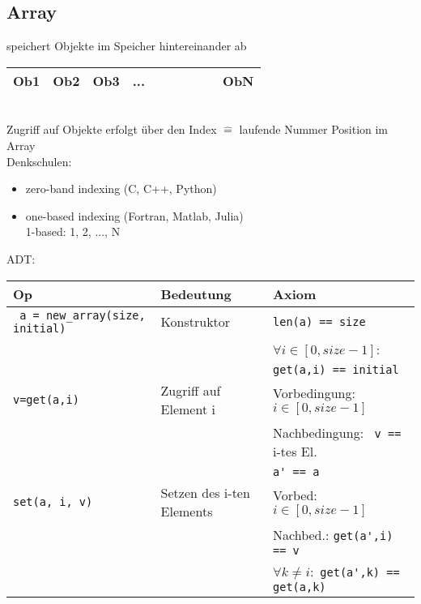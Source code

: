     \subsection{Array}
    speichert Objekte im Speicher hintereinander ab \\

    \begin{tabular}{| C{1cm} | C{1cm} | C{1cm} | C{1cm} |C{1cm} | C{1cm}| C{1cm} |C{1cm}| C{1cm}| C{1cm}| }
        \hline
        Ob1 & Ob2 & Ob3 & ... & & & & & & ObN \\ \hline
    \end{tabular} \\

    Zugriff auf Objekte erfolgt über den Index $\widehat{=}$ laufende Nummer Position im Array \\

    Denkschulen:
    \begin{itemize}
        \item zero-band indexing (C, C++, Python) \\
        \item one-based indexing (Fortran, Matlab, Julia)\\
        1-based: 1, 2, ..., N
    \end{itemize}

    ADT: \\
    \begin{tabular}{C{5cm} C{5cm} C{5cm}}
        Op & Bedeutung & Axiom \\ \hline
        \verb| a = new_array(size, initial)| & Konstruktor & \verb|len(a) == size| \\
        & & $\forall i \in [0, size - 1]$: \\
        & & \verb|get(a,i) == initial| \\ \hline
        \verb|v=get(a,i)| & Zugriff auf Element i & Vorbedingung: $i \in [0, size-1]$ \\
        & & Nachbedingung: \verb| v ==| i-tes El. \\
        & & \verb|a' == a| \\ \hline
        \verb|set(a, i, v)| & Setzen des i-ten Elements & Vorbed: $ i \in [0, size-1]$ \\
        & & Nachbed.: \verb|get(a',i) == v| \\
        & & $\forall k \neq i:$ \verb|get(a',k) == get(a,k)| \\
    \end{tabular}

